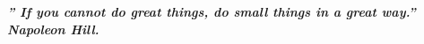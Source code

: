 \documentclass[12pt, french]{article}
\begin{document}









\begin{center} 
	\emph{\textbf{” If you cannot do great things, do small things in a great way.” ~ Napoleon Hill.}}
\end{center}











\end{document}
